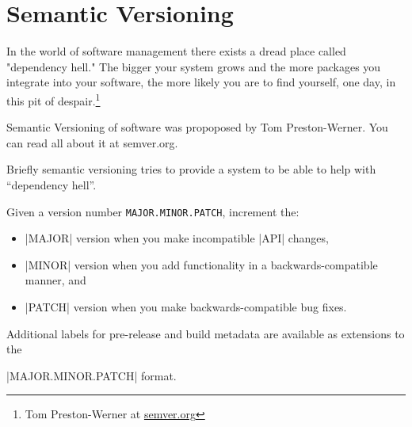 \chapter{Semantic Versioning}

In the world of software management there exists a dread place called "dependency hell." The bigger your system grows and the more packages you integrate into your software, the more likely you are to find yourself, one day, in this pit of despair.\footnote{Tom Preston-Werner at \protect\url{semver.org}}

Semantic Versioning of software was propoposed by Tom Preston-Werner. You can read all about it
at semver.org.

Briefly semantic versioning tries to provide a system to be able to help with \enquote{dependency hell}.

Given a version number \texttt{MAJOR.MINOR.PATCH}, increment the:

\begin{itemize}
\item |MAJOR| version when you make incompatible |API| changes,

\item |MINOR| version when you add functionality in a backwards-compatible manner, and

\item |PATCH| version when you make backwards-compatible bug fixes.
\end{itemize}

Additional labels for pre-release and build metadata are available as extensions to the 

|MAJOR.MINOR.PATCH| format.